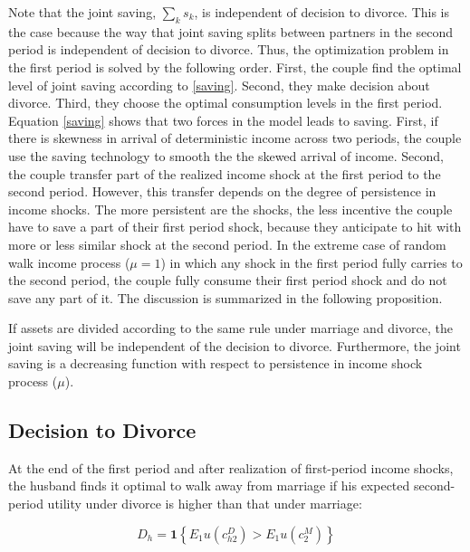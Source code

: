 Note that the joint saving, \( \sum_k s_k\), is independent of decision to divorce. This is the case because the way that joint saving splits between partners in the second period is independent of decision to divorce. Thus, the optimization problem in the first period is solved by the following order. First, the couple find the optimal level of joint saving according to \eqref{saving}. Second, they make decision about divorce. Third, they choose the optimal consumption levels in the first period. \\

Equation \eqref{saving} shows that two forces in the model leads to saving. First, if there is skewness in arrival of deterministic income across two periods, the couple use the saving technology to smooth the the skewed arrival of income. Second, the couple transfer part of the realized income shock at the first period to the second period. However, this transfer depends on the degree of persistence in income shocks. The more persistent are the shocks, the less incentive the couple have to save a part of their first period shock, because they anticipate to hit with more or less similar shock at the second period. In the extreme case of random walk income process ($\mu = 1$) in which any shock in the first period fully carries to the second period, the couple fully consume their first period shock and do not save any part of it. The discussion is summarized in the following proposition.

\begin{prop}
If assets are divided according to the same rule under marriage and divorce, the joint saving will be independent of the decision to divorce. Furthermore, the joint saving is a decreasing function with respect to persistence in income shock process ($\mu$). 
\end{prop}
 

\subsection{Decision to Divorce}
At the end of the first period and after realization of first-period income shocks, the husband finds it optimal to walk away from marriage if his expected second-period utility under divorce is higher than that under marriage:

\begin{equation}
D_h = \mathbf 1 \left \{ E_1 u(c_{h2}^D) > E_1 u(c_2^M) \right \}
\label{div}
\end{equation}

